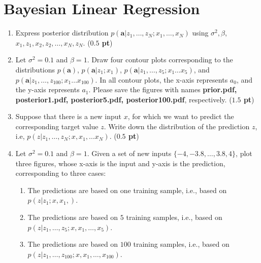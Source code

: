 \documentclass[twoside]{article}
\begin{document}
\section{Bayesian Linear Regression}
\begin{enumerate}
\item Express posterior distribution $p(\mathbf{a}|z_1,\ldots,z_{N} ; x_1, \ldots, x_N)$ using $\sigma^2, \beta$, $x_1, z_1, x_2, z_2, \ldots, x_N, z_N$.
   ({\bf $0.5$ pt})

      \begin{center}
   \end{center}
\item Let $\sigma^2=0.1$ and $\beta=1$. Draw four contour plots corresponding to the distributions $p(\mathbf{a})$, $p(\mathbf{a}|z_1;x_1)$, $p(\mathbf{a}|z_1,\ldots, z_{5}; x_1 \ldots x_5)$, and $p(\mathbf{a}| z_1,\ldots,z_{100}; x_1 \ldots x_{100})$. In all contour plots, the x-axis represents $a_0$, and the y-axis represents $a_1$. Please save the figures with names \textbf{prior.pdf, posterior1.pdf, posterior5.pdf, posterior100.pdf}, respectively. ({\bf $1.5$ pt})

\item Suppose that there is a new input $x$, for which we want to predict the corresponding target value $z$. Write down the distribution of the prediction $z$, i.e, $p(z|z_1,\ldots,z_N ; x, x_1, \ldots x_N)$. ({\bf $0.5$ pt})
     \begin{center}
   \end{center}


\item Let $\sigma^2=0.1$ and $\beta=1$. Given a set of new inputs $\{-4,-3.8,\ldots,3.8,4\}$, plot three figures, whose x-axis is the input and y-axis is the prediction, corresponding to three cases:
    \begin{enumerate}
    \item The predictions are based on one training sample, i.e., based on $p(z|z_1;x,x_1,)$.
    \item The predictions are based on $5$ training samples, i.e., based on $p(z|z_1,\ldots,z_{5};x,x_1,\ldots,x_{5})$.
    \item The predictions are based on $100$ training samples, i.e., based on  $p(z|z_1,\ldots,z_{100};x,x_1,\ldots,x_{100})$.
    \end{enumerate}


\end{enumerate}
\end{document}

